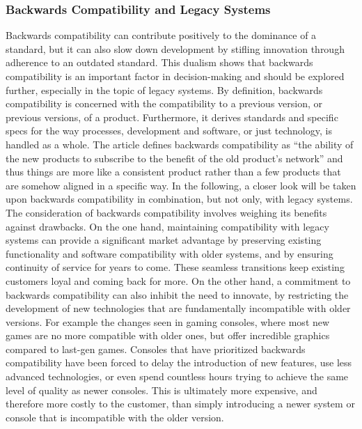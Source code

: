\subsubsection{Backwards Compatibility and Legacy Systems}
Backwards compatibility can contribute positively to the dominance of a standard, but it can also slow down development by stifling innovation through adherence to an outdated standard. This dualism shows that backwards compatibility is an important factor in decision-making and should be explored further, especially in the topic of legacy systems.
\newline \noindent By definition, backwards compatibility is concerned with the compatibility to a previous version, or previous versions, of a product. Furthermore, it derives standards and specific specs for the way processes, development and software, or just technology, is handled as a whole. The article  defines backwards compatibility as “the ability of the new products to subscribe to the 
benefit of the old product’s network” and thus things are more like a consistent product rather than a few products that are somehow aligned in a specific way. In the following, a closer look will be taken upon backwards compatibility in combination, but not only, with legacy systems.
\newline \noindent The consideration of backwards compatibility involves weighing its benefits against drawbacks. On the one hand, maintaining compatibility with legacy systems can provide a significant market advantage by preserving existing functionality and software compatibility with older systems, and by ensuring continuity of service for years to come. These seamless transitions keep existing customers loyal and coming back for more. 
\newline \noindent On the other hand, a commitment to backwards compatibility can also inhibit the need to innovate, by restricting the development of new technologies that are fundamentally incompatible with older versions. For example the changes seen in gaming consoles, where most new games are no more compatible with older ones, but offer incredible graphics compared to last-gen games. Consoles that have prioritized backwards compatibility have been forced to delay the introduction of new features, use less advanced technologies, or even spend countless hours trying to achieve the same level of quality as newer consoles. This is ultimately more expensive, and therefore more costly to the customer, than simply introducing a newer system or console that is incompatible with the older version. 
